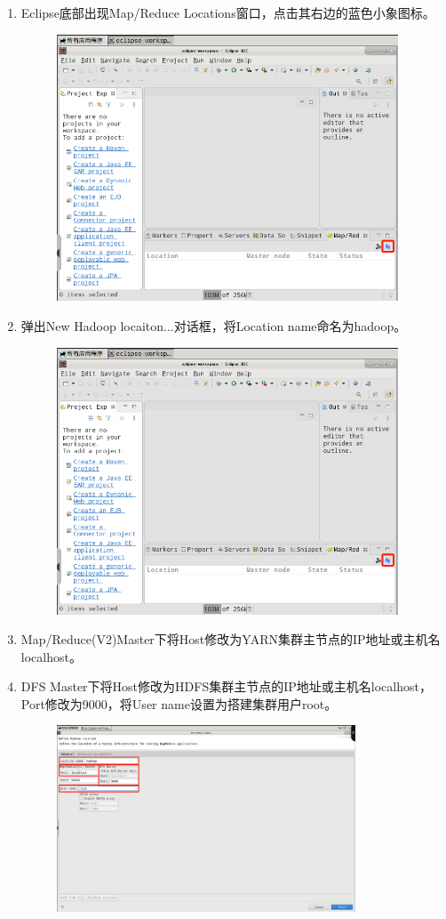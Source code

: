 \documentclass {article}
\begin{document}
\begin{enumerate}
					\item Eclipse底部出现Map/Reduce Locations窗口，点击其右边的蓝色小象图标。
					\begin{figure}[H]
						\centering
						\includegraphics[width=4in]{figures/fig6.png}
					\end{figure}
				
					\item 弹出New Hadoop locaiton...对话框，将Location name命名为hadoop。
					\begin{figure}[H]
						\centering
						\includegraphics[width=4in]{figures/fig6.png}
					\end{figure}
				
					\item Map/Reduce(V2)Master下将Host修改为YARN集群主节点的IP地址或主机名localhost。
					\item DFS Master下将Host修改为HDFS集群主节点的IP地址或主机名localhost，Port修改为9000，将User name设置为搭建集群用户root。
					\begin{figure}[H]
						\centering
						\includegraphics[width=3.5in]{figures/fig7.png}
					\end{figure}
				\end{enumerate}
			
\end{document}
